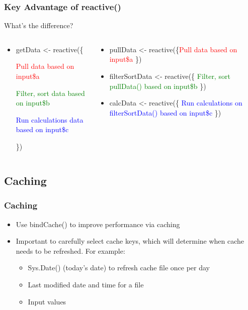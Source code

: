 \documentclass[
	11pt, %
]{beamer}
\begin{document}
\begin{frame}
	\frametitle{Key Advantage of reactive()}	
	
	What's the difference?	
	
	\begin{columns}
    \begin{column}{0.47\textwidth}
    \begin{itemize}        
        \item getData \textless- reactive(\{
        
			\indent \textcolor{red}{Pull data based on input\$a}
			
			\indent \textcolor{green}{Filter, sort data based on input\$b}		        

        	\indent \textcolor{blue}{Run calculations data based on input\$c}
        	
        \})
        \end{itemize}
    \end{column}
    \begin{column}{0.5\textwidth}
       
       \begin{itemize}
       \item pullData \textless- reactive(\{\textcolor{red}{Pull data based on input\$a} \})       
       \item filterSortData \textless- reactive(\{ \textcolor{green}{Filter, sort pullData() based on input\$b} \})       
	   \item calcData \textless- reactive(\{ \textcolor{blue}{Run calculations on filterSortData() based on input\$c} \})
       \end{itemize}       

       
    \end{column}
\end{columns}
	
\end{frame}


\subsection{Caching}

\begin{frame}
	\frametitle{Caching}
	
	\begin{itemize}
		\item Use bindCache() to improve performance via caching
		\item Important to carefully select cache keys, which will determine when cache needs to be refreshed. For example:
	\begin{itemize}
		\item Sys.Date() (today's date) to refresh cache file once per day
		\item Last modified date and time for a file
		\item Input values
	\end{itemize}
	\end{itemize}
\end{frame}
\end{document}
